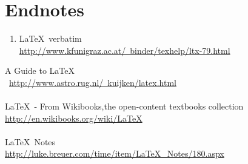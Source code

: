 \documentclass[12pt,letterpaper,dvips]{article}
\newcommand{\FIXME}[1]{\textsf{[FIXME: #1]}}
\newcommand{\cmd}[1]{\texttt{#1}}
\begin{document}





\clearpage
\newpage
\setcounter{secnumdepth}{0}
\section{Endnotes}

\begin{enumerate}

\item \LaTeX\ verbatim\\
\href{http://www.kfunigraz.ac.at/~binder/texhelp/ltx-79.html}
{http://www.kfunigraz.ac.at/~binder/texhelp/ltx-79.html}

\end{enumerate}





A Guide to \LaTeX\\\
\href{http://www.astro.rug.nl/~kuijken/latex.html}
{http://www.astro.rug.nl/~kuijken/latex.html}
\\
\\
\LaTeX\ - From Wikibooks,the open-content textbooks collection\\
\href{http://en.wikibooks.org/wiki/LaTeX}{http://en.wikibooks.org/wiki/LaTeX}
\\
\\
\LaTeX\ Notes\\
\href{http://luke.breuer.com/time/item/LaTeX\_Notes/180.aspx}{http://luke.breuer.com/time/item/LaTeX\_Notes/180.aspx}
\end{document}
